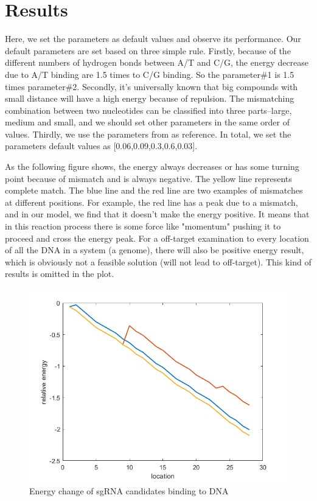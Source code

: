 \section{Results}
Here, we set the parameters as default values and observe its performance. Our default parameters are set based on three simple rule. Firstly, because of the different numbers of hydrogen bonds between A/T and C/G, the energy decrease due to A/T binding are 1.5 times to C/G binding. So the parameter\#1 is 1.5 times parameter\#2. Secondly, it's universally known that big compounds with small distance will have a high energy because of repulsion. The mismatching combination between two nucleotides can be classified into three parts--large, medium and small, and we should set other parameters in the same order of values. Thirdly, we use the parameters from \cite{klein2018hybridization} as reference. In total, we set the parameters default values as [0.06,0.09,0.3,0.6,0.03].

 As the following figure shows, the energy always decreases or has some turning point because of mismatch and is always negative. The yellow line represents complete match. The blue line and the red line are two examples of mismatches at different positions. For example, the red line has a peak due to a mismatch, and in our model, we find that it doesn't make the energy positive. It means that in this reaction process there is some force like "momentum" pushing it to proceed and cross the energy peak. For a off-target examination to every location of all the DNA in a system (a genome), there will also be positive energy result, which is obviously not a feasible solution (will not lead to off-target). This kind of results is omitted in the plot.
\begin{figure}[H]
\centering
\includegraphics[width=0.7\linewidth]{energy_change}
\caption{Energy change of sgRNA candidates binding to DNA}
\label{fig:energychange}
\end{figure}


